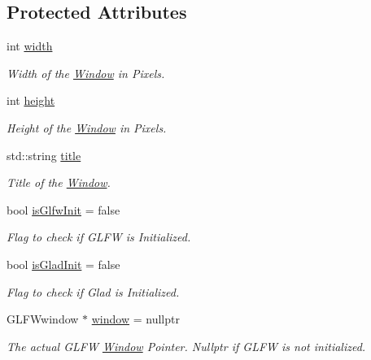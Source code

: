 \subsection*{Protected Attributes}
\begin{DoxyCompactItemize}
\item 
\mbox{\label{class_window_af5b1c436782cc9752d386493fbc5dc8c}} 
int \mbox{\hyperlink{class_window_af5b1c436782cc9752d386493fbc5dc8c}{width}}
\begin{DoxyCompactList}\small\item\em Width of the \mbox{\hyperlink{class_window}{Window}} in Pixels. \end{DoxyCompactList}\item 
\mbox{\label{class_window_af0ac1732ca6b79a6f6b78aa344140514}} 
int \mbox{\hyperlink{class_window_af0ac1732ca6b79a6f6b78aa344140514}{height}}
\begin{DoxyCompactList}\small\item\em Height of the \mbox{\hyperlink{class_window}{Window}} in Pixels. \end{DoxyCompactList}\item 
\mbox{\label{class_window_accc3e5364fced57c273820aa51410e12}} 
std\+::string \mbox{\hyperlink{class_window_accc3e5364fced57c273820aa51410e12}{title}}
\begin{DoxyCompactList}\small\item\em Title of the \mbox{\hyperlink{class_window}{Window}}. \end{DoxyCompactList}\item 
\mbox{\label{class_window_aaeb459aaf4e4f822bb7411d557312328}} 
bool \mbox{\hyperlink{class_window_aaeb459aaf4e4f822bb7411d557312328}{is\+Glfw\+Init}} = false
\begin{DoxyCompactList}\small\item\em Flag to check if G\+L\+FW is Initialized. \end{DoxyCompactList}\item 
\mbox{\label{class_window_a7a64d5cb08cc14d5d87cb4efa03fcb92}} 
bool \mbox{\hyperlink{class_window_a7a64d5cb08cc14d5d87cb4efa03fcb92}{is\+Glad\+Init}} = false
\begin{DoxyCompactList}\small\item\em Flag to check if Glad is Initialized. \end{DoxyCompactList}\item 
\mbox{\label{class_window_a9957db4afdad3d57e5c5b6626b44b6d0}} 
G\+L\+F\+Wwindow $\ast$ \mbox{\hyperlink{class_window_a9957db4afdad3d57e5c5b6626b44b6d0}{window}} = nullptr
\begin{DoxyCompactList}\small\item\em The actual G\+L\+FW \mbox{\hyperlink{class_window}{Window}} Pointer. Nullptr if G\+L\+FW is not initialized. \end{DoxyCompactList}\end{DoxyCompactItemize}
